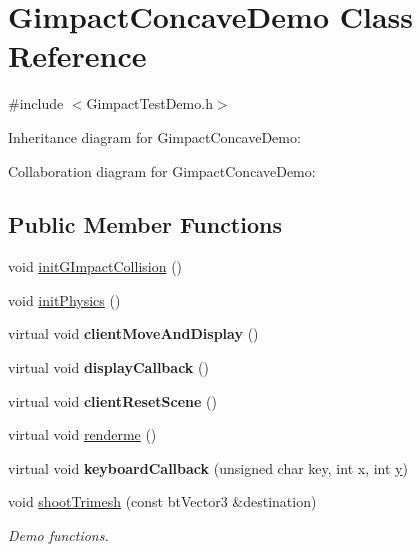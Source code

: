 \hypertarget{class_gimpact_concave_demo}{\section{Gimpact\+Concave\+Demo Class Reference}
\label{class_gimpact_concave_demo}
}


{\ttfamily \#include $<$Gimpact\+Test\+Demo.\+h$>$}



Inheritance diagram for Gimpact\+Concave\+Demo\+:


Collaboration diagram for Gimpact\+Concave\+Demo\+:
\subsection*{Public Member Functions}
\begin{DoxyCompactItemize}
\item 
void \hyperlink{class_gimpact_concave_demo_a6481f85fe81982e76c33ad5e44732cd3}{init\+G\+Impact\+Collision} ()
\item 
void \hyperlink{class_gimpact_concave_demo_aec87f0852ce9585a7cb666eb4f324adc}{init\+Physics} ()
\item 
\hypertarget{class_gimpact_concave_demo_a9beab06d24498f13d94c7f28dc4f0bba}{virtual void {\bfseries client\+Move\+And\+Display} ()}\label{class_gimpact_concave_demo_a9beab06d24498f13d94c7f28dc4f0bba}

\item 
\hypertarget{class_gimpact_concave_demo_a16e75003fd2477a4c2e93c328c08e1fc}{virtual void {\bfseries display\+Callback} ()}\label{class_gimpact_concave_demo_a16e75003fd2477a4c2e93c328c08e1fc}

\item 
\hypertarget{class_gimpact_concave_demo_ab545ac042d917f865b30e90b16c1a6d0}{virtual void {\bfseries client\+Reset\+Scene} ()}\label{class_gimpact_concave_demo_ab545ac042d917f865b30e90b16c1a6d0}

\item 
virtual void \hyperlink{class_gimpact_concave_demo_aa783b2596b6d35d3d9ce90a0143ab60c}{renderme} ()
\item 
\hypertarget{class_gimpact_concave_demo_ae3ada2857dd479636659290a28b4bc6d}{virtual void {\bfseries keyboard\+Callback} (unsigned char key, int x, int \hyperlink{_ice_utils_8h_aa7ffaed69623192258fb8679569ff9ba}{y})}\label{class_gimpact_concave_demo_ae3ada2857dd479636659290a28b4bc6d}

\item 
\hypertarget{class_gimpact_concave_demo_a6b4fd1fdaf2eb8dff4f381fcdd2f5a52}{void \hyperlink{class_gimpact_concave_demo_a6b4fd1fdaf2eb8dff4f381fcdd2f5a52}{shoot\+Trimesh} (const bt\+Vector3 \&destination)}\label{class_gimpact_concave_demo_a6b4fd1fdaf2eb8dff4f381fcdd2f5a52}

\begin{DoxyCompactList}\small\item\em Demo functions. \end{DoxyCompactList}\end{DoxyCompactItemize}
